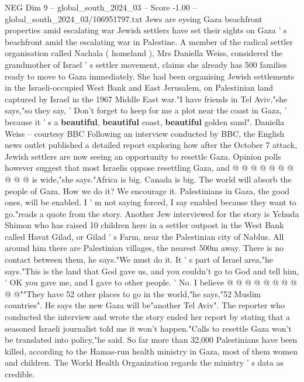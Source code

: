 \begin{textsample}{NEG Dim 9 – global\_south\_2024\_03 – Score -1.00 – global\_south\_2024\_03/106951797.txt}  \label{ex:f9_neg_406}
Jews are eyeing Gaza beachfront properties amid escalating war Jewish settlers have set their sights on Gaza ' s beachfront amid the escalating war in Palestine.
A member of the radical settler organisation called Nachala ( homeland ), Mrs Daniella Weiss, considered the grandmother of Israel ' s settler movement, claims she already has 500 families ready to move to Gaza immediately.
She had been organising Jewish settlements in the Israeli-occupied West Bank and East Jerusalem, on Palestinian land captured by Israel in the 1967 Middle East war."I have friends in Tel Aviv,"she says,"so they say, ' Don't forget to keep for me a plot near the coast in Gaza, ' because it ' s a \textbf{beautiful}, \textbf{beautiful} coast, \textbf{beautiful} golden sand".
Daniella Weiss -- courtesy BBC Following an interview conducted by BBC, the English news outlet published a detailed report exploring how after the October 7 attack, Jewish settlers are now seeing an opportunity to resettle Gaza.
Opinion polls however suggest that most Israelis oppose resettling Gaza, and @ @ @ @ @ @ @ @ @ @ is wide,"she says."Africa is big.
Canada is big.
The world will absorb the people of Gaza.
How we do it?
We encourage it.
Palestinians in Gaza, the good ones, will be enabled.
I ' m not saying forced, I say enabled because they want to go."reads a quote from the story.
Another Jew interviewed for the story is Yehuda Shimon who has raised 10 children here in a settler outpost in the West Bank called Havat Gilad, or Gilad ' s Farm, near the Palestinian city of Nablus.
All around him there are Palestinian villages, the nearest 500m away.
There is no contact between them, he says."We must do it.
It ' s part of Israel area,"he says."This is the land that God gave us, and you couldn't go to God and tell him, ' OK you gave me, and I gave to other people. ' No.
I believe @ @ @ @ @ @ @ @ @ @""They have 52 other places to go in the world,"he says,"52 Muslim countries".
He says the new Gaza will be"another Tel Aviv".
The reporter who conducted the interview and wrote the story ended her report by stating that a seasoned Israeli journalist told me it won't happen."Calls to resettle Gaza won't be translated into policy,"he said.
So far more than 32,000 Palestinians have been killed, according to the Hamas-run health ministry in Gaza, most of them women and children.
The World Health Organization regards the ministry ' s data as credible.

\end{textsample}
